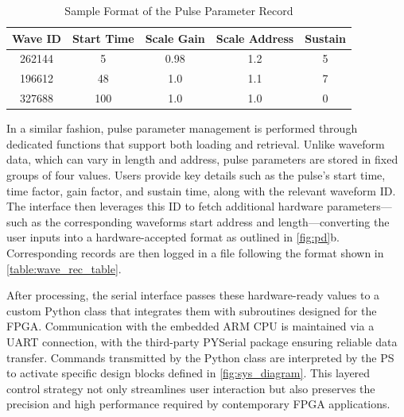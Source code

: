 \begin{table}[ht]
\setlength{\abovecaptionskip}{5pt}    %
\setlength{\belowcaptionskip}{5pt}    %
\centering
\caption{Sample Format of the Pulse Parameter Record}
\label{table:wave_rec_table}
\begin{tabular}{|c|c|c|c|c|}
\hline
Wave ID & Start Time & Scale Gain & Scale Address & Sustain \\
\hline
262144 & 5 & 0.98 & 1.2 & 5\\
\hline
196612 & 48 & 1.0 & 1.1 & 7\\
\hline
327688 & 100 & 1.0 & 1.0 & 0\\
\hline
\end{tabular}
\end{table}

In a similar fashion, pulse parameter management is performed through dedicated functions that support both loading and retrieval. Unlike waveform data, which can vary in length and address, pulse parameters are stored in fixed groups of four values. Users provide key details such as the pulse's start time, time factor, gain factor, and sustain time, along with the relevant waveform ID. The interface then leverages this ID to fetch additional hardware parameters—such as the corresponding waveforms start address and length—converting the user inputs into a hardware-accepted format as outlined in \autoref{fig:pd}b. Corresponding records are then logged in a file following the format shown in \autoref{table:wave_rec_table}.

After processing, the serial interface passes these hardware-ready values to a custom Python class that integrates them with subroutines designed for the FPGA. Communication with the embedded ARM CPU is maintained via a UART connection, with the third-party PYSerial package ensuring reliable data transfer. Commands transmitted by the Python class are interpreted by the PS to activate specific design blocks defined in \autoref{fig:sys_diagram}. This layered control strategy not only streamlines user interaction but also preserves the precision and high performance required by contemporary FPGA applications.